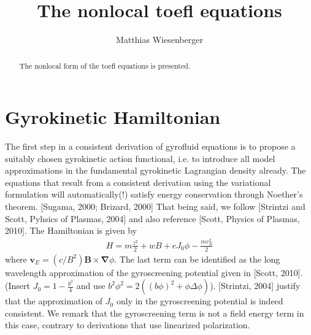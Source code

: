 \documentclass[a4paper,12pt]{scrartcl}
\title{The nonlocal toefl equations}
\author{Matthias  Wiesenberger}
\renewcommand{\vec}[1]{{\mathbf{#1}}}
\begin{document}
\maketitle
\begin{abstract}
    The nonlocal form of the toefl equations is presented.
\end{abstract}
\section{Gyrokinetic Hamiltonian}
The first step in a consistent derivation of gyrofluid equations
is to propose a suitably chosen
gyrokinetic action functional, i.e. to introduce all model approximations 
in the fundamental gyrokinetic Lagrangian density already. The equations that
result from a consistent derivation using 
the variational formulation will automatically(!) satisfy 
energy conservation through Noether's theorem. [Sugama, 2000; Brizard, 2000]
That being said, 
we follow [Strintzi and Scott, Pyhsics of Plasmas, 2004] and also reference
[Scott, Physics of Plasmas, 2010]. 
The Hamiltonian is given by
\begin{align}
    H = m\frac{z^2}{2} + wB+eJ_0\phi- \frac{mv_E^2}{2}
    \label{eq:hamiltonian}
\end{align}
where $\vec v_E= (c/B^2)\vec B \times \vec\nabla \phi$. The last term can be 
identified as the 
long wavelength approximation of the gyroscreening potential given in [Scott, 2010].
(Insert $J_0 = 1-\frac{b^2}{4}$ and use $b^2\phi^2 = 2\left(  ( b\phi)^2 + \phi\Delta \phi\right)$).
[Strintzi, 2004] justify that the approximation of $J_0$ only in the 
gyroscreening potential is indeed consistent. We remark that the gyroscreening
term is not a field energy term in this case, contrary to derivations that 
use linearized polarization. 
\end{document}
